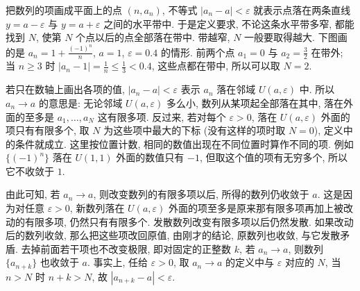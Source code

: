 \documentclass[UTF8,openany]{ctexbook}
\theoremstyle{chinesetextbook}
\begin{document}
把数列的项画成平面上的点 $(n,a_n)$, 不等式 $|a_n-a|<\varepsilon$ 就表示点落在两条直线 $y=a-\varepsilon$ 与 $y=a+\varepsilon$ 之间的水平带中. 于是定义要求, 不论这条水平带多窄, 都能找到 $N$, 使第 $N$ 个点以后的点全部落在带中. 带越窄, $N$ 一般要取得越大. 下图画的是 $\displaystyle a_n=1+\frac{(-1)^n}n$, $a=1$, $\varepsilon=0.4$ 的情形. 前两个点 $a_1=0$ 与 $\displaystyle a_2=\frac32$ 在带外; 当 $n\ge3$ 时 $\displaystyle|a_n-1|=\frac1n\le\frac13<0.4$, 这些点都在带中, 所以可以取 $N=2$.
\begin{center}
\end{center}

若只在数轴上画出各项的值, $|a_n-a|<\varepsilon$ 表示 $a_n$ 落在邻域 $U(a,\varepsilon)$ 中. 所以 $a_n\to a$ 的意思是: 无论邻域 $U(a,\varepsilon)$ 多么小, 数列从某项起全部落在其中, 落在外面的至多是 $a_1,\ldots,a_N$ 这有限多项. 反过来, 若对每个 $\varepsilon>0$, 落在 $U(a,\varepsilon)$ 外面的项只有有限多个, 取 $N$ 为这些项中最大的下标 (没有这样的项时取 $N=0$), 定义中的条件就成立. 这里按位置计数, 相同的数值出现在不同位置时算作不同的项. 例如 $\{(-1)^n\}$ 落在 $U(1,1)$ 外面的数值只有 $-1$, 但取这个值的项有无穷多个, 所以它不收敛于 $1$.

由此可知, 若 $a_n\to a$, 则改变数列的有限多项以后, 所得的数列仍收敛于 $a$. 这是因为对任意 $\varepsilon>0$, 新数列落在 $U(a,\varepsilon)$ 外面的项至多是原来那有限多项再加上被改动的有限多项, 仍然只有有限多个. 发散数列改变有限多项以后仍然发散. 如果改动后的数列收敛, 那么把这些项改回原值, 由刚才的结论, 原数列也收敛, 与它发散矛盾. 去掉前面若干项也不改变极限, 即对固定的正整数 $k$, 若 $a_n\to a$, 则数列 $\{a_{n+k}\}$ 也收敛于 $a$. 事实上, 任给 $\varepsilon>0$, 取 $a_n\to a$ 的定义中与 $\varepsilon$ 对应的 $N$, 当 $n>N$ 时 $n+k>N$, 故 $|a_{n+k}-a|<\varepsilon$.
\end{document}
